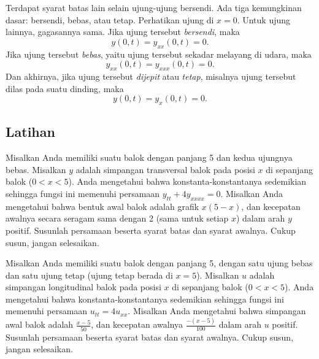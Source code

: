 Terdapat syarat batas lain selain ujung-ujung bersendi.  Ada
tiga kemungkinan dasar: bersendi, bebas, atau tetap.  Perhatikan
ujung di $x=0$.  Untuk ujung lainnya, gagasannya sama.
Jika ujung tersebut \emph{bersendi}, maka
\begin{equation*}
y(0,t) = y_{xx}(0,t) = 0 .
\end{equation*}
Jika ujung tersebut \emph{bebas}, yaitu ujung tersebut sekadar
melayang di udara, maka
\begin{equation*}
y_{xx}(0,t) = y_{xxx}(0,t) = 0 .
\end{equation*}
Dan akhirnya, jika ujung tersebut
\emph{dijepit}
atau  
\emph{tetap}, misalnya ujung tersebut dilas pada suatu
dinding,
maka
\begin{equation*}
y(0,t) = y_{x}(0,t) = 0 .
\end{equation*}


\subsection{Latihan}

\begin{exercise}
Misalkan Anda memiliki suatu balok dengan panjang 5 dan kedua ujungnya bebas.  Misalkan $y$ adalah
simpangan transversal balok pada posisi $x$ di sepanjang balok ($0 < x < 5$).
Anda mengetahui bahwa
konstanta-konstantanya sedemikian sehingga fungsi ini memenuhi persamaan $y_{tt} + 4 y_{xxxx} =
0$.  Misalkan Anda mengetahui bahwa bentuk awal balok adalah grafik
$x(5-x)$, dan kecepatan awalnya secara seragam sama dengan 2 (sama untuk setiap $x$)
dalam arah $y$ positif.  Susunlah persamaan beserta
syarat batas dan syarat awalnya.  Cukup susun, jangan selesaikan.
\end{exercise}

\begin{exercise}
Misalkan Anda memiliki suatu balok dengan panjang 5, dengan satu ujung bebas dan satu ujung tetap
(ujung tetap berada di $x=5$).
Misalkan $u$ adalah
simpangan longitudinal balok pada posisi $x$ di sepanjang balok ($0 < x < 5$).
Anda mengetahui bahwa
konstanta-konstantanya sedemikian sehingga fungsi ini memenuhi persamaan $u_{tt} = 4 u_{xx}$.
Misalkan Anda mengetahui bahwa simpangan awal balok
adalah $\frac{x-5}{50}$, dan kecepatan awalnya $\frac{-(x-5)}{100}$
dalam arah $u$ positif.  Susunlah persamaan beserta
syarat batas dan syarat awalnya.  Cukup susun, jangan selesaikan.
\end{exercise}

